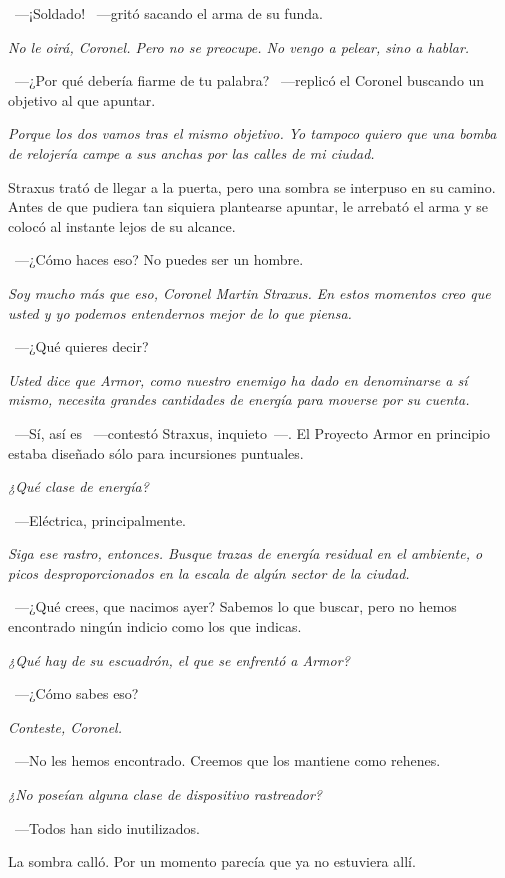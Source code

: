 ~---¡Soldado! ~---gritó sacando el arma de su funda.

\emph{No le oirá, Coronel. Pero no se preocupe. No vengo a pelear, sino a hablar.}

~---¿Por qué debería fiarme de tu palabra? ~---replicó el Coronel buscando un objetivo al que apuntar.

\emph{Porque los dos vamos tras el mismo objetivo. Yo tampoco quiero que una bomba de relojería campe a sus anchas por las calles de mi ciudad.}

Straxus trató de llegar a la puerta, pero una sombra se interpuso en su camino. Antes de que pudiera tan siquiera plantearse apuntar, le arrebató el arma y se colocó al instante lejos de su alcance.

~---¿Cómo haces eso? No puedes ser un hombre.

\emph{Soy mucho más que eso, Coronel Martin Straxus. En estos momentos creo que usted y yo podemos entendernos mejor de lo que piensa.}

~---¿Qué quieres decir?

\emph{Usted dice que Armor, como nuestro enemigo ha dado en denominarse a sí mismo, necesita grandes cantidades de energía para moverse por su cuenta.}

~---Sí, así es ~---contestó Straxus, inquieto~---. El Proyecto Armor en principio estaba diseñado sólo para incursiones puntuales.

\emph{¿Qué clase de energía?}

~---Eléctrica, principalmente.

\emph{Siga ese rastro, entonces. Busque trazas de energía residual en el ambiente, o picos desproporcionados en la escala de algún sector de la ciudad.}

~---¿Qué crees, que nacimos ayer? Sabemos lo que buscar, pero no hemos encontrado ningún indicio como los que indicas.

\emph{¿Qué hay de su escuadrón, el que se enfrentó a Armor?}

~---¿Cómo sabes eso?

\emph{Conteste, Coronel.}

~---No les hemos encontrado. Creemos que los mantiene como rehenes.

\emph{¿No poseían alguna clase de dispositivo rastreador?}

~---Todos han sido inutilizados.

La sombra calló. Por un momento parecía que ya no estuviera allí.

